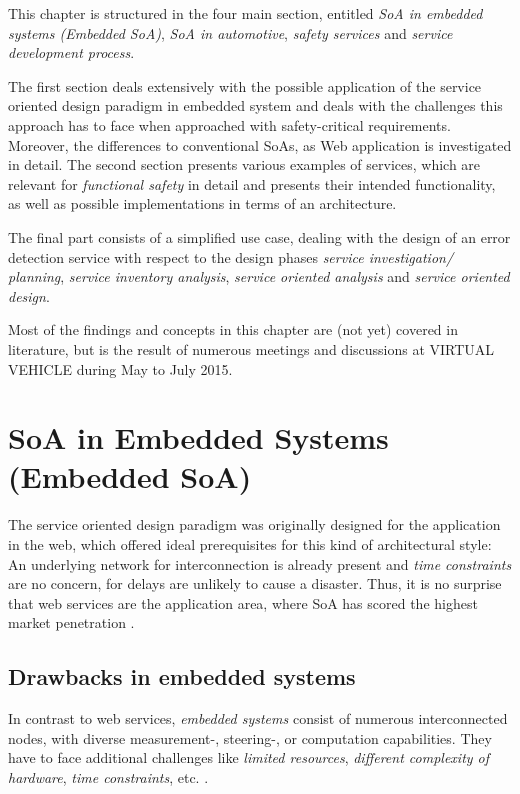 \label{ch:methods}

This chapter is structured in the four main section, entitled \emph{SoA in embedded systems (Embedded SoA)}, \emph{SoA in automotive}, \emph{safety services} and \emph{service development process}. 

The first section deals extensively with the possible application of the service oriented design paradigm in embedded system and deals with the challenges this approach has to face when approached with safety-critical requirements. Moreover, the differences to conventional SoAs, as Web application is investigated in detail. 
The second section presents various examples of services, which are relevant for \emph{functional safety} in detail and presents their intended functionality, as well as possible implementations in terms of an architecture.

The final part consists of a simplified use case, dealing with the design of an error detection service with respect to the design phases \emph{service investigation/ planning}, \emph{service inventory analysis}, \emph{service oriented analysis} and \emph{service oriented design}.

Most of the findings and concepts in this chapter are (not yet) covered in literature, but is the result of numerous meetings and discussions at VIRTUAL VEHICLE during May to July 2015.









\section{SoA in Embedded Systems (Embedded SoA)}
\label{sec:soa-in-embedded-systems}

The service oriented design paradigm was originally designed for the application in the web, which offered ideal prerequisites for this kind of architectural style: An underlying network for interconnection is already present and \emph{time constraints} are no concern, for delays are unlikely to cause a disaster. Thus, it is no surprise that web services are the application area, where SoA has scored the highest market penetration \cite{rodrigues2011} \cite{buckl}.


\subsection{Drawbacks in embedded systems}
In contrast to web services, \emph{embedded systems} consist of numerous interconnected nodes, with diverse measurement-, steering-, or computation capabilities. They have to face additional challenges like \emph{limited resources}, \emph{different complexity of hardware}, \emph{time constraints}, etc. \cite{scholz} \cite{sommer}. 

